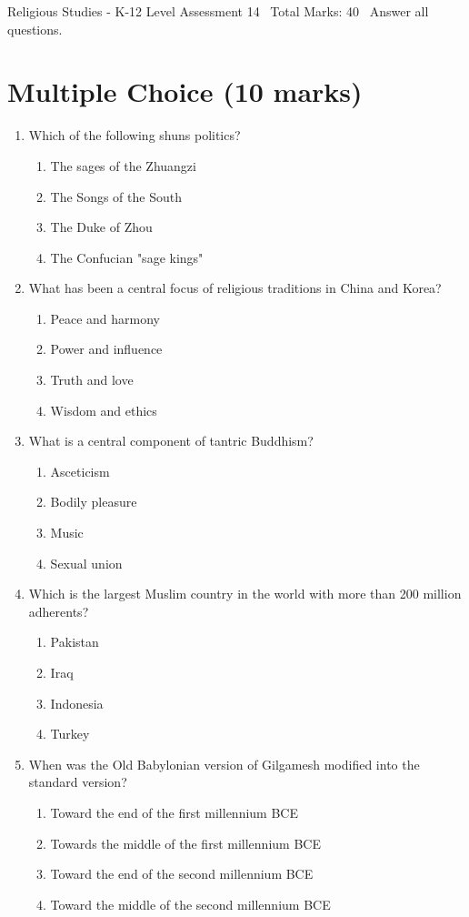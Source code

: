 \documentclass[12pt]{article}
\begin{document}
\begin{center}
Religious Studies - K-12 Level Assessment 14 \
Total Marks: 40 \
Answer all questions.
\end{center}

\section*{Multiple Choice (10 marks)}
\begin{enumerate}[label=\arabic*.]
\item Which of the following shuns politics?
\begin{enumerate}[label=(\alph*)]
    \item The sages of the Zhuangzi
    \item The Songs of the South
    \item The Duke of Zhou
    \item The Confucian "sage kings"
\end{enumerate}
\item What has been a central focus of religious traditions in China and Korea?
\begin{enumerate}[label=(\alph*)]
    \item Peace and harmony
    \item Power and influence
    \item Truth and love
    \item Wisdom and ethics
\end{enumerate}
\item What is a central component of tantric Buddhism?
\begin{enumerate}[label=(\alph*)]
    \item Asceticism
    \item Bodily pleasure
    \item Music
    \item Sexual union
\end{enumerate}
\item Which is the largest Muslim country in the world with more than 200 million adherents?
\begin{enumerate}[label=(\alph*)]
    \item Pakistan
    \item Iraq
    \item Indonesia
    \item Turkey
\end{enumerate}
\item When was the Old Babylonian version of Gilgamesh modified into the standard version?
\begin{enumerate}[label=(\alph*)]
    \item Toward the end of the first millennium BCE
    \item Towards the middle of the first millennium BCE
    \item Toward the end of the second millennium BCE
    \item Toward the middle of the second millennium BCE
\end{enumerate}
\end{enumerate}
\end{document}
